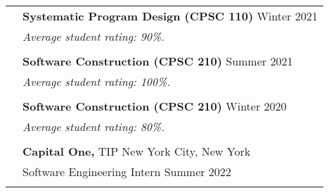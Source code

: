 \documentclass[letterpaper, 11pt]{article}
\begin{document}
\begin{longtable}{p{1.3in}p{4.8in}}
	 & \textbf{Systematic Program Design (CPSC 110)} \hfill Winter 2021                                                                                                                                       \\
	 & \textit{Average student rating: 90\%.}                                                                                                                                                                 \\
	 &                                                                                                                                                                                                        \\

	 & \textbf{Software Construction (CPSC 210)} \hfill Summer 2021                                                                                                                                           \\
	 & \textit{Average student rating: 100\%.}                                                                                                                                                                \\
	 &                                                                                                                                                                                                        \\

	 & \textbf{Software Construction (CPSC 210)} \hfill Winter 2020                                                                                                                                           \\
	 & \textit{Average student rating: 80\%.}                                                                                                                                                                 \\
	 &                                                                                                                                                                                                        \\

	{\color{Blue}{Industry Experience}}
	 & {\textbf{Capital One,}} TIP \hfill New York City, New York                                                                                                                                             \\
	 & Software Engineering Intern \hfill Summer 2022                                                                                                                                                         \\
	 &                                                                                                                                                                                                        \\


\end{longtable}
\end{document}
